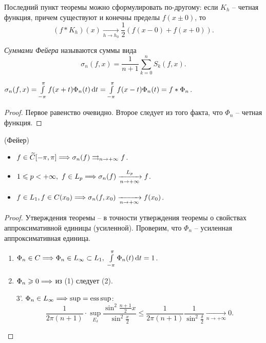 \begin{remark}
    Последний пункт теоремы можно сформулировать по-другому:
    если $K_h$ -- четная функция, причем существуют и конечны пределы
    $f(x \pm 0)$, то
    \[
        (f \ast K_h)(x) \xrightarrow[h \to h_0]{} \frac{1}{2} (f(x - 0) + f(x + 0))
    .\]
\end{remark}

\begin{definition}
    \textit{Суммами Фейера} называются суммы вида
    \[
        \sigma_n(f, x) = \frac{1}{n + 1} \sum_{k = 0}^n{S_k(f, x)}
    .\]
\end{definition}

\begin{lemma}
    $\sigma_n(f, x) = \int\limits_{-\pi}^\pi{f(x + t) \Phi_n(t) \,\mathrm{d}t} =
    \int\limits_{-\pi}^\pi{f(x - t) \Phi_n(t)} = f \ast \Phi_n$.
\end{lemma}
\begin{proof}
    Первое равенство очевидно. Второе следует из того факта, что $\Phi_n$ --
    четная функция.
\end{proof}

\begin{theorem}(Фейер)
    \enewline
    \begin{itemize}
        \item $f \in \widetilde{C}[-\pi, \pi] \Longrightarrow \sigma_n(f) \rightrightarrows_{n \to +\infty} f$.
        \item $1 \leqslant p < +\infty,~ f \in L_p \Longrightarrow \sigma_n(f) 
            \xrightarrow[n \to +\infty]{L_p} f$.
        \item $f \in L_1, f \in C(x_0) \Longrightarrow \sigma_n(f, x_0) \xrightarrow[n \to +\infty]{} f(x_0)$.
    \end{itemize}
\end{theorem}
\begin{proof}
    Утверждения теоремы -- в точности утверждения теоремы о свойствах аппроксимативной
    единицы (усиленной). Проверим, что $\Phi_n$ -- усиленная аппроксимативная единица.
    \begin{enumerate}
        \item $\Phi_n \in C \Longrightarrow \Phi_n \in L_\infty \subset L_1,~
            \int\limits_{-\pi}^\pi{\Phi_n(t) \,\mathrm{d}t} = 1$.
        \item $\Phi_n \geqslant 0 \Longrightarrow $ из (1) следует (2).
        \item[3'.] $\Phi_n \in L_\infty \Longrightarrow \sup = \operatorname*{ess\,sup}$:
            \[
                \frac{1}{2 \pi (n + 1)} \cdot \sup_{E_\delta}{\frac{\sin^2
                {\frac{n + 1}{2} x}}{\sin^2{\frac{x}{2}}}} \leqslant
                \frac{1}{2 \pi (n + 1)} \frac{1}{\sin^2{\frac{\delta}{2}}}
                \xrightarrow[n \to +\infty]{} 0
            .\]
    \end{enumerate}
\end{proof}

